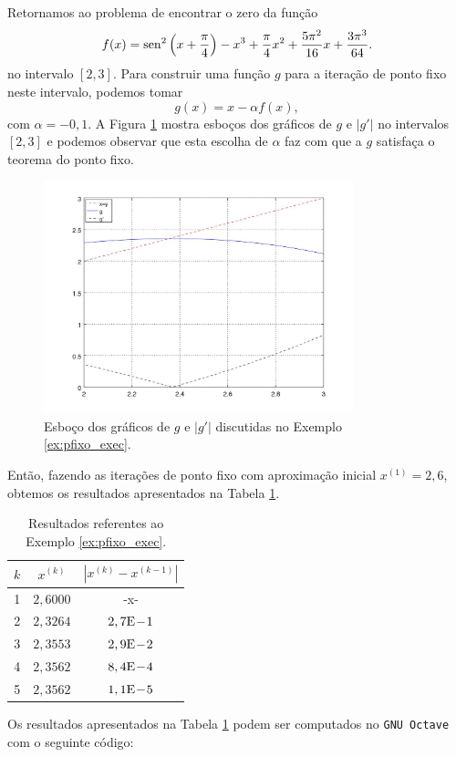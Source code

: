 \begin{ex}\label{ex:pfixo_exec}
  Retornamos ao problema de encontrar o zero da função
  \begin{equation}
    f(x) = \operatorname{sen}^2\left(x+\frac{\pi}{4}\right) - x^3 + \frac{\pi}{4}x^2 + \frac{5\pi^2}{16}x + \frac{3\pi^3}{64}.
  \end{equation}
  no intervalo $[2,3]$. Para construir uma função $g$ para a iteração de ponto fixo neste intervalo, podemos tomar
  \begin{equation}
    g(x) = x - \alpha f(x),
  \end{equation}
com $\alpha = -0,1$. A Figura \ref{fig:ex_pfixo_exec} mostra esboços dos gráficos de $g$ e $|g'|$ no intervalos $[2, 3]$ e podemos observar que esta escolha de $\alpha$ faz com que a $g$ satisfaça o teorema do ponto fixo.

\begin{figure}[h!]
  \centering
  \includegraphics[width=0.8\textwidth]{./cap_eq1d/dados/ex_pfixo_exec/fig_ex_pfixo_exec}
  \caption{Esboço dos gráficos de $g$ e $|g'|$ discutidas no Exemplo \ref{ex:pfixo_exec}.}
  \label{fig:ex_pfixo_exec}
\end{figure}

Então, fazendo as iterações de ponto fixo com aproximação inicial $x^{(1)}=2,6$, obtemos os resultados apresentados na Tabela \ref{tab:ex_pfixo_exec}.

\begin{table}[h!]
  \centering
  \begin{tabular}{r|cc}
    $k$ & $x^{(k)}$ & $|x^{(k)}-x^{(k-1)}|$ \\\hline
    1 & $2,6000$ & -x-\\
    2 & $2,3264$ & $2,7\mathrm{E}\!-\!1$ \\
    3 & $2,3553$ & $2,9\mathrm{E}\!-\!2$ \\
    4 & $2,3562$ & $8,4\mathrm{E}\!-\!4$ \\
    5 & $2,3562$ & $1,1\mathrm{E}\!-\!5$ \\\hline
  \end{tabular}
  \caption{Resultados referentes ao Exemplo \ref{ex:pfixo_exec}.}
  \label{tab:ex_pfixo_exec}
\end{table}

\ifisoctave
Os resultados apresentados na Tabela \ref{tab:ex_pfixo_exec} podem ser computados no \verb+GNU Octave+ com o seguinte código:

\fi
\end{ex}

